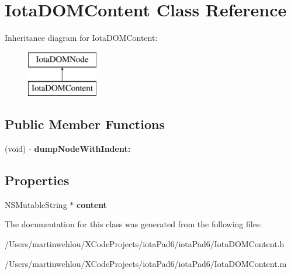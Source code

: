 \hypertarget{interface_iota_d_o_m_content}{
\section{IotaDOMContent Class Reference}
\label{interface_iota_d_o_m_content}
}
Inheritance diagram for IotaDOMContent:\begin{figure}[H]
\begin{center}
\leavevmode
\includegraphics[height=2.000000cm]{interface_iota_d_o_m_content}
\end{center}
\end{figure}
\subsection*{Public Member Functions}
\begin{DoxyCompactItemize}
\item 
\hypertarget{interface_iota_d_o_m_content_a9cbd8b65054f040a43600679c75b4841}{
(void) -\/ {\bfseries dumpNodeWithIndent:}}
\label{interface_iota_d_o_m_content_a9cbd8b65054f040a43600679c75b4841}

\end{DoxyCompactItemize}
\subsection*{Properties}
\begin{DoxyCompactItemize}
\item 
\hypertarget{interface_iota_d_o_m_content_a6c5f740e21be6e85414289620f9d3c82}{
NSMutableString $\ast$ {\bfseries content}}
\label{interface_iota_d_o_m_content_a6c5f740e21be6e85414289620f9d3c82}

\end{DoxyCompactItemize}


The documentation for this class was generated from the following files:\begin{DoxyCompactItemize}
\item 
/Users/martinwehlou/XCodeProjects/iotaPad6/iotaPad6/IotaDOMContent.h\item 
/Users/martinwehlou/XCodeProjects/iotaPad6/iotaPad6/IotaDOMContent.m\end{DoxyCompactItemize}
